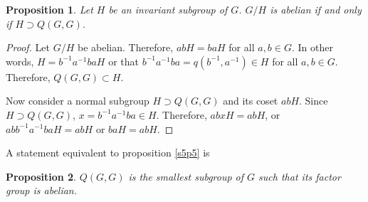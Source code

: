\documentclass{article}
\theoremstyle{plain}
\numberwithin{thm}{section}
\theoremstyle{plain}
\newtheorem{prop}{Proposition}
\numberwithin{prop}{section}
\theoremstyle{definition}
\numberwithin{defn}{section}
\theoremstyle{remark}
\numberwithin{equation}{section}
\begin{document}
\begin{prop}\label{s5p5}
Let $H$ be an invariant subgroup of $G$. $G/H$ is abelian if and only if $H
\supset Q(G, G)$.
\end{prop}
\begin{proof}
Let $G/H$ be abelian. Therefore, $abH = baH$ for all $a, b \in G$. In other
words, $H = b^{-1}a^{-1}baH$ or that $b^{-1}a^{-1}ba = q(b^{-1}, a^{-1}) \in
H$ for all $a, b \in G$. Therefore, $Q(G, G) \subset H$.

Now consider a normal subgroup $H \supset Q(G, G)$ and its coset $abH$.
Since $H \supset Q(G, G)$, $x = b^{-1}a^{-1}ba \in H$. Therefore, $abxH = abH$,
or $abb^{-1}a^{-1}ba H = abH$ or $baH = abH$.
\end{proof}

A statement equivalent to proposition \eqref{s5p5} is
\begin{prop}\label{s5p6}
$Q(G, G)$ is the smallest subgroup of $G$ such that its factor group is
abelian.
\end{prop}
\nocite{*}


\end{document}
